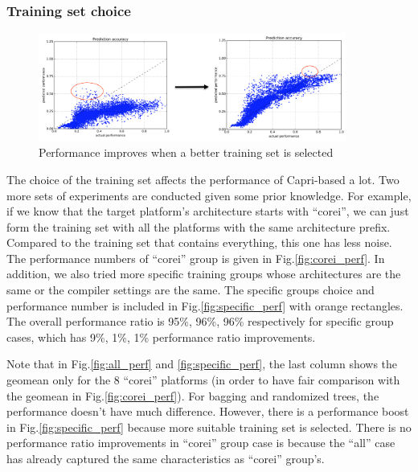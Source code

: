     \subsubsection{Training set choice}
    \label{sec:training_set}
    \begin{figure}[tbhp]
      \centering
      \includegraphics[width=0.9\textwidth]{images/ypei_perf_change.png}
      \caption{Performance improves when a better training set is selected}
      \label{fig:ypei_perf_change}
    \end{figure}
    The choice of the training set affects the performance of Capri-based \atl
    a lot. Two more sets of experiments are conducted given some prior
    knowledge. For example, if we know that the target platform's architecture
    starts with ``corei'', we can just form the training set with all the
    platforms with the same architecture prefix. Compared to the training set
    that contains everything, this one has less noise. The performance numbers
    of ``corei'' group is given in Fig.\ref{fig:corei_perf}. In addition, we
    also tried more specific training groups whose architectures are the same or
    the compiler settings are the same. The specific groups choice and
    performance number is included in Fig.\ref{fig:specific_perf} with orange
    rectangles. The overall
    performance ratio is 95\%, 96\%, 96\% respectively for specific group cases,
    which has 9\%, 1\%, 1\% performance ratio improvements.

    Note that in Fig.\ref{fig:all_perf} and \ref{fig:specific_perf}, the last
    column shows the geomean only for the 8 ``corei'' platforms (in order to
    have fair comparison with the geomean in Fig.\ref{fig:corei_perf}). For
    bagging and randomized
    trees, the performance doesn't have much difference. However, there is a
    performance boost in Fig.\ref{fig:specific_perf} because more suitable
    training set is selected. There is no performance ratio improvements in
    ``corei'' group case is because the ``all'' case has already captured
    the same characteristics as ``corei'' group's.

